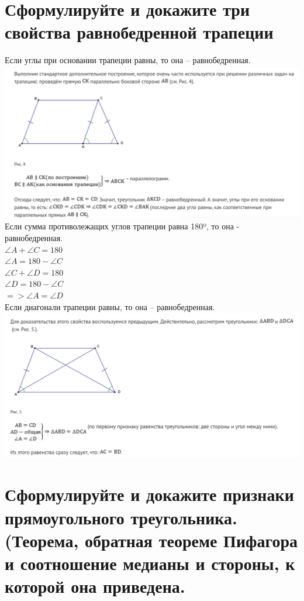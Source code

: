 \documentclass[12pt, letterpaper]{article}
\begin{document}
\section {Сформулируйте и докажите три свойства равнобедренной трапеции}
Если углы при основании трапеции равны, то она -- равнобедренная. \\
\includegraphics[scale=0.3]{legal-6.jpg}\\
Если сумма противолежащих углов трапеции равна 180º, то она - равнобедренная. \\
$\angle A + \angle C = 180 $\\
$\angle A = 180 - \angle C $\\
$\angle C + \angle D = 180 $\\
$\angle D = 180 - \angle C $\\
$=> \angle A = \angle D$\\
Если диагонали трапеции равны, то она -- равнобедренная. \\
\includegraphics[scale=0.3]{legal-7.jpg}\\

\section {Сформулируйте и докажите признаки прямоугольного треугольника. (Теорема, обратная теореме Пифагора и соотношение медианы и стороны, к которой она приведена.}
\end{document}

